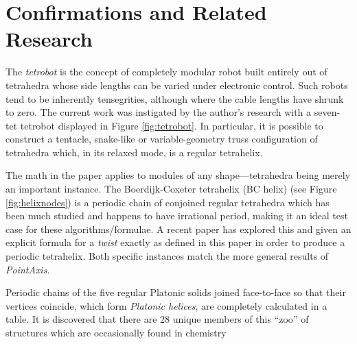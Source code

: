 \documentclass{svproc}
\begin{document}
\section{Confirmations and Related Research}

The {\em tetrobot}\cite{TetrobotBook} is the concept of completely
modular robot built entirely out of tetrahedra whose side lengths can
be varied under electronic control. Such robots tend to be inherently
tensegrities\cite{NTRT}, although where the cable lengths
have shrunk to zero.
The current work was instigated by the author's research with a seven-tet tetrobot
displayed in Figure
\ref{fig:tetrobot}.
In particular, it is possible to construct a tentacle, snake-like or
variable-geometry truss configuration of tetrahedra which, in its relaxed
mode, is a regular tetrahelix.

The math in the paper applies to modules of any shape---tetrahedra being
merely an important instance.
The Boerdijk-Coxeter tetrahelix (BC helix) (see Figure \ref{fig:helixnodes}) is a periodic chain of conjoined regular tetrahedra
which has been much studied\cite{coxeter1985simplicial,sadler2019periodic,fuller1982synergetics,read2018transforming}
and happens to have irrational period, making it an ideal
test case for these algorithms/formulae. A recent paper\cite{sadler2019periodic} has explored this
and given an explicit formula for a {\em twist} exactly as defined in this
paper in order to produce a periodic tetrahelix. Both specific instances match the more general results of {\em PointAxis}.

Periodic chains of the five regular Platonic solids joined face-to-face so that their vertices coincide,
which form {\em Platonic helices}\cite{elgersma2016quadrahelix,lord2001sphere}, are completely calculated in a table\cite{readfullsegmentedhelix}.
It is discovered that there are 28 unique members of this ``zoo'' of structures which are occasionally found in chemistry\cite{lord2004gamma,pearce1990structure}






\appendix
\end{document}
